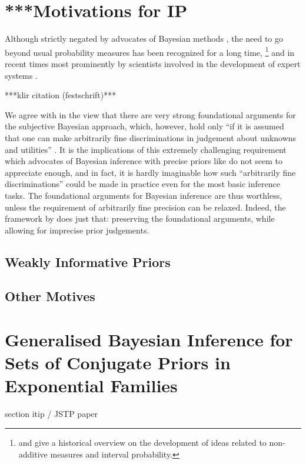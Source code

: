 \section{***Motivations for IP}
\label{sec:motivation}

Although strictly negated by advocates of Bayesian methods \parencite[e.g., by][]{1987:lindley},
the need to go beyond usual probability measures has been recognized for a long time,%
\footnote{\textcite{2009:hampel} and \textcite[\S 1]{2001:weichselberger} give a historical overview on the development of
ideas related to non-additive measures and interval probability.}
and in recent times most prominently by scientists involved in the development of expert systems \parencite{1996:walley::expert}.

***klir citation (festschrift)***

We agree with \textcite[\S 1.1]{1994:berger} in the view that there are very strong foundational arguments
for the subjective Bayesian approach, which, however, hold only
``if it is assumed that one can make arbitrarily fine discriminations
in judgement about unknowns and utilities'' \parencite[p.~303]{1994:berger}. 
It is the implications of this extremely challenging requirement
which advocates of Bayesian inference with precise priors
like \textcite{1987:lindley} do not seem to appreciate enough,
and in fact, it is hardly imaginable how such ``arbitrarily fine discriminations''
could be made in practice even for the most basic inference tasks.
The foundational arguments for Bayesian inference are thus worthless,
unless the requirement of arbitrarily fine precision can be relaxed.
Indeed, the framework by \textcite{1991:walley} does just that:
preserving the foundational arguments,
while allowing for imprecise prior judgements.





\subsection{\pdc }

\subsection{Weakly Informative Priors}
\label{sec:motivation:near-ignorance}

\subsection{Other Motives}


\section{Generalised Bayesian Inference for Sets of Conjugate Priors in Exponential Families}
\label{sec:imprecisebayes-conjugate}

section itip / JSTP paper



